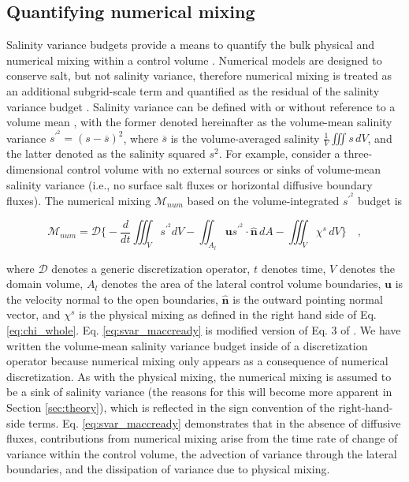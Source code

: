 \documentclass[draft]{agujournal2019}
\begin{document}
\subsection{Quantifying numerical mixing}

Salinity variance budgets provide a means to quantify the bulk physical and numerical mixing within a control volume \cite{Li_2018, Lorenz_2021, Qu_2022_box}. Numerical models are designed to conserve salt, but not salinity variance, therefore numerical mixing is treated as an additional subgrid-scale term and quantified as the residual of the salinity variance budget \cite{MacCready_2018}. Salinity variance can be defined with or without reference to a volume mean \cite{Burchard_2008, Qu_2022_box}, with the former denoted hereinafter as the volume-mean salinity variance $s^{\prime^2} = (s-\overline{s})^2$, where $\overline{s}$ is the volume-averaged salinity $\frac{1}{V} \iiint s \, dV$, and the latter denoted as the salinity squared $s^2$. For example, consider a three-dimensional control volume with no external sources or sinks of volume-mean salinity variance (i.e., no surface salt fluxes or horizontal diffusive boundary fluxes). The numerical mixing $\mathcal{M}_{num}$ based on the volume-integrated $s^{\prime^2}$ budget is
\begin{linenomath*}
\begin{equation} \label{eq:svar_maccready}
    \mathcal{M}_{num} = \mathcal{D} \biggl\{-\frac{d}{dt} \iiint_V s^{\prime^2} dV - \iint_{A_l} \mathbf{u}s^{\prime^2} \cdot \hat{\mathbf{n}} \,  dA - \iiint_V \chi^s \, dV \biggl\} \quad ,
\end{equation}
\end{linenomath*}
where $\mathcal{D}$ denotes a generic discretization operator, $t$ denotes time, $V$ denotes the domain volume, $A_l$ denotes the area of the lateral control volume boundaries, $\mathbf{u}$ is the velocity normal to the open boundaries, $\hat{\mathbf{n}}$ is the outward pointing normal vector, and $\chi^s$ is the physical mixing as defined in the right hand side of Eq. \ref{eq:chi_whole}. Eq. \ref{eq:svar_maccready} is modified version of Eq. 3 of . We have written the volume-mean salinity variance budget inside of a discretization operator because numerical mixing only appears as a consequence of numerical discretization. As with the physical mixing, the numerical mixing is assumed to be a sink of salinity variance (the reasons for this will become more apparent in Section \ref{sec:theory}), which is reflected in the sign convention of the right-hand-side terms. Eq. \ref{eq:svar_maccready} demonstrates that in the absence of diffusive fluxes, contributions from numerical mixing arise from the time rate of change of variance within the control volume, the advection of variance through the lateral boundaries, and the dissipation of variance due to physical mixing. 
\end{document}
